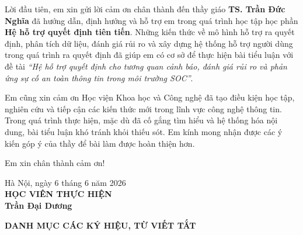 \documentclass[a4paper,12pt,oneside]{book}
\begin{document}
{\fontsize{13pt}{15.6pt}\selectfont
Lời đầu tiên, em xin gửi lời cảm ơn chân thành đến thầy giáo \textbf{TS. Trần Đức Nghĩa} đã hướng dẫn, định hướng và hỗ trợ em trong quá trình học tập học phần \textbf{Hệ hỗ trợ quyết định tiên tiến}. Những kiến thức về mô hình hỗ trợ ra quyết định, phân tích dữ liệu, đánh giá rủi ro và xây dựng hệ thống hỗ trợ người dùng trong quá trình ra quyết định đã giúp em có cơ sở để thực hiện bài tiểu luận với đề tài \textit{“Hệ hỗ trợ quyết định cho tương quan cảnh báo, đánh giá rủi ro và phản ứng sự cố an toàn thông tin trong môi trường SOC”}.}

{\fontsize{13pt}{15.6pt}\selectfont
Em cũng xin cảm ơn Học viện Khoa học và Công nghệ đã tạo điều kiện học tập, nghiên cứu và tiếp cận các kiến thức mới trong lĩnh vực công nghệ thông tin. Trong quá trình thực hiện, mặc dù đã cố gắng tìm hiểu và hệ thống hóa nội dung, bài tiểu luận khó tránh khỏi thiếu sót. Em kính mong nhận được các ý kiến góp ý của thầy để bài làm được hoàn thiện hơn.}

{\fontsize{13pt}{15.6pt}\selectfont
Em xin chân thành cảm ơn!
}

\vspace{1.2cm}
\begin{flushright}
  {\fontsize{13pt}{15.6pt}\selectfont 
  Hà Nội, ngày 6 tháng 6 năm 2026\\[0.3cm]
  \textbf{HỌC VIÊN THỰC HIỆN}\\[2.5cm]
  \textbf{Trần Đại Dương}}
\end{flushright}

\newpage



\newpage

{
\fontsize{13pt}{15.6pt}\selectfont
\tableofcontents
}

\clearpage
\thispagestyle{empty}

\begin{center}
    {\fontsize{16pt}{20pt}\selectfont\textbf{DANH MỤC CÁC KÝ HIỆU, TỪ VIẾT TẮT}}
\end{center}
\end{document}
